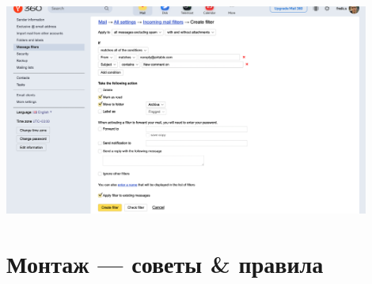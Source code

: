 \documentclass[
a4paper, %
12pt, %
article,
onecolumn, %
openany, %
]{memoir}
\begin{document}
\begin{enumerate}
	    \begin{center} 
	        \includegraphics[width=0.9\textwidth]{AirTableSpam/ya2} 
	    \end{center}

\end{enumerate}

\newpage
\section{Монтаж --- советы \& правила}\label{montageRules}
\end{document}
